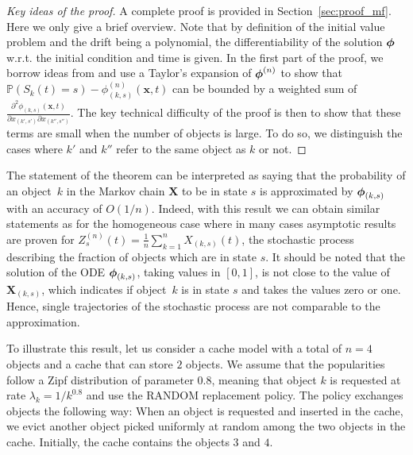 \documentclass[acmsmall]{acmart}
\newcommand\bx{\mathbf{x}}
\newcommand\bX{\mathbf{X}}
\newcommand\bphi{\text{\boldmath$\phi$}}
\newcommand\toN{^{(n)}}
\newcommand\Zn{Z\toN}
\newcommand\Proba[1]{\mathbb{P}\left(#1\right)} %
\begin{document}
\begin{proof}[Key ideas of the proof]
  A complete proof is provided in Section~\ref{sec:proof_mf}. Here we only give a brief overview. Note that by definition of the initial value problem and the drift being a polynomial, the differentiability of the solution $\bphi$ w.r.t. the initial condition and time is given. In the first part of the proof, we borrow ideas from \cite{kolokoltsovMeanFieldGames2012,gast2017expected} and use a Taylor's expansion of $\bphi\toN$ to show that $\Proba{S_k(t)=s} - \phi\toN_{(k,s)}(\bx,t)$ can be bounded by a weighted sum of $\frac{\partial^2 \phi_{(k,s)}(\bx,t)}{\partial x_{(k',s')} \partial x_{(k'',s'')}}$.  The key technical difficulty of the proof is then to show that these terms are small when the number of objects is large. To do so, we distinguish the cases where $k'$ and $k''$ refer to the same object as $k$ or not. 
\end{proof}

The statement of the theorem can be interpreted as saying that the probability of an object~$k$ in the Markov chain $\bX$ to be in state $s$ is approximated by $\bphi_{(k,s)}$ with an accuracy of $O(1/n)$. Indeed, with this result we can obtain similar statements as for the homogeneous case where in many cases asymptotic results are  proven for $\Zn_s(t) = \frac1n\sum_{k=1}^n X_{(k,s)}(t)$, the stochastic process describing the fraction of objects which are in state $s$. It should be noted that the solution of the ODE $\bphi_{(k,s)}$, taking values in $[0,1]$, is not close to the value of $\bX_{(k,s)}$, which indicates if object~$k$ is in state $s$ and takes the values zero or one. Hence, single trajectories of the stochastic process are not comparable to the approximation. 

To illustrate this result, let us consider a cache model with a total of $n=4$ objects and a cache  that can store $2$ objects. We assume that the popularities follow a Zipf distribution of parameter $0.8$, meaning that object $k$ is requested at rate $\lambda_k=1/k^{0.8}$ and use the RANDOM replacement policy. The policy exchanges objects the following way: When an object is requested and inserted in the cache, we evict another object picked uniformly at random among the two objects in the cache. Initially, the cache contains the objects $3$ and $4$.
\end{document}
